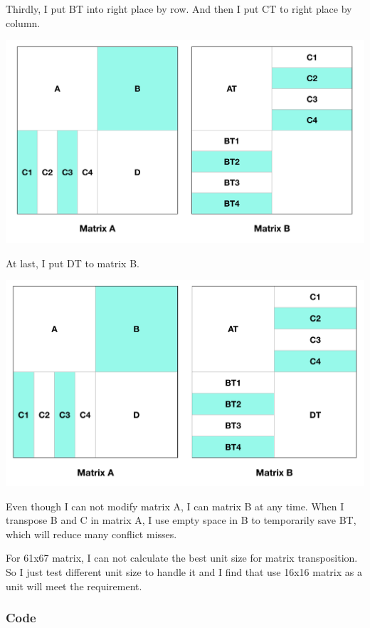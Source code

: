 \documentclass{article}
\begin{document}
Thirdly, I put BT into right place by row. And then I put CT to right place by column. 

\includegraphics[scale=0.35]{6.png}

At last, I put DT to matrix B.

\includegraphics[scale=0.35]{7.png}

Even though I can not modify matrix A, I can matrix B at any time. When I transpose B and C in matrix A, I use empty space in B to temporarily save BT, which will reduce many conflict misses.

For 61x67 matrix, I can not calculate the best unit size for matrix transposition. So I just test different unit size to handle it and I find that use 16x16 matrix as a unit will meet the requirement.
\subsubsection{Code}
\end{document}
